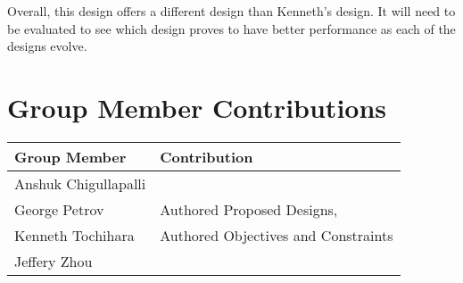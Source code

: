     Overall, this design offers a different design than Kenneth's design. It will need to be evaluated to see which design proves to have better performance as each of the designs evolve.
    
    

\section{Group Member Contributions}

    \begin{table}[H]
        \begin{center}
        \begin{tabular}{ | p{2in} | p{4in}| } 
            \hline
            \textbf{Group Member} & \textbf{Contribution} \\  \hline
            Anshuk Chigullapalli & \\ \hline
            George Petrov & Authored Proposed Designs, \\ \hline
            Kenneth Tochihara & Authored Objectives and Constraints\\ \hline
            Jeffery Zhou & \\ \hline
        \end{tabular}
        \end{center}
    \end{table}




% 
    
